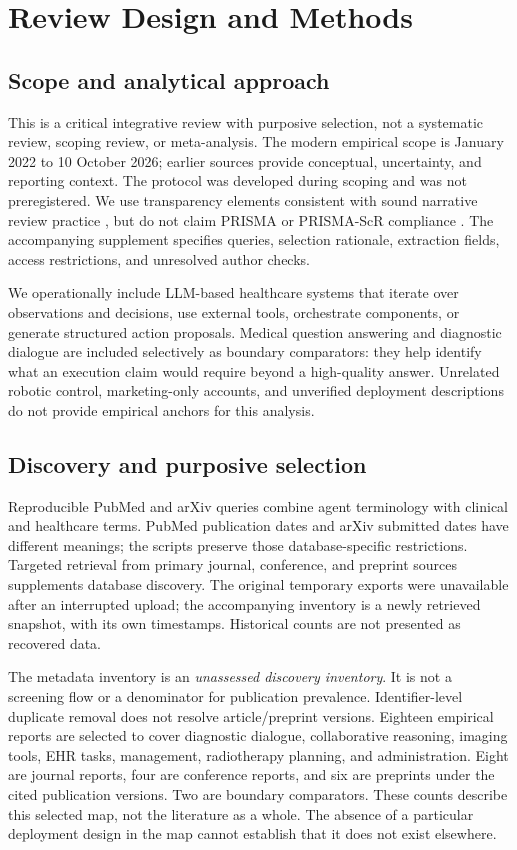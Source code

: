 \section{Review Design and Methods}
\subsection{Scope and analytical approach}
This is a critical integrative review with purposive selection, not a systematic review, scoping review, or meta-analysis. The modern empirical scope is January 2022 to 10 October 2026; earlier sources provide conceptual, uncertainty, and reporting context. The protocol was developed during scoping and was not preregistered. We use transparency elements consistent with sound narrative review practice \cite{sanra2019}, but do not claim PRISMA or PRISMA-ScR compliance \cite{prisma2020,prismascr2018}. The accompanying supplement specifies queries, selection rationale, extraction fields, access restrictions, and unresolved author checks.

We operationally include LLM-based healthcare systems that iterate over observations and decisions, use external tools, orchestrate components, or generate structured action proposals. Medical question answering and diagnostic dialogue are included selectively as boundary comparators: they help identify what an execution claim would require beyond a high-quality answer. Unrelated robotic control, marketing-only accounts, and unverified deployment descriptions do not provide empirical anchors for this analysis.

\subsection{Discovery and purposive selection}
Reproducible PubMed and arXiv queries combine agent terminology with clinical and healthcare terms. PubMed publication dates and arXiv submitted dates have different meanings; the scripts preserve those database-specific restrictions. Targeted retrieval from primary journal, conference, and preprint sources supplements database discovery. The original temporary exports were unavailable after an interrupted upload; the accompanying inventory is a newly retrieved snapshot, with its own timestamps. Historical counts are not presented as recovered data.

The metadata inventory is an \emph{unassessed discovery inventory}. It is not a screening flow or a denominator for publication prevalence. Identifier-level duplicate removal does not resolve article/preprint versions. Eighteen empirical reports are selected to cover diagnostic dialogue, collaborative reasoning, imaging tools, EHR tasks, management, radiotherapy planning, and administration. Eight are journal reports, four are conference reports, and six are preprints under the cited publication versions. Two are boundary comparators. These counts describe this selected map, not the literature as a whole. The absence of a particular deployment design in the map cannot establish that it does not exist elsewhere.

